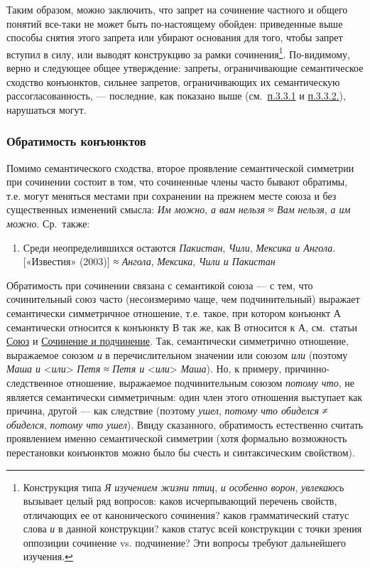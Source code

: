 Таким образом, можно заключить, что запрет на сочинение частного и
общего понятий все-таки не может быть по-настоящему обойден: приведенные
выше способы снятия этого запрета или убирают основания для того, чтобы
запрет вступил в силу, или выводят конструкцию за рамки
сочинения\footnote{Конструкция типа \textit{Я изучением жизни птиц},
  \textit{и особенно ворон}, \textit{увлекаюсь} вызывает целый ряд вопросов:
  каков исчерпывающий перечень свойств, отличающих ее от канонического
  сочинения? каков грамматический статус слова \textit{и} в данной
  конструкции? каков статус всей конструкции с точки зрения оппозиции
  сочинение vs. подчинение? Эти вопросы требуют дальнейшего изучения.}.
По-видимому, верно и следующее общее утверждение: запреты,
ограничивающие семантическое сходство конъюнктов, сильнее запретов,
ограничивающих их семантическую рассогласованность, --- последние, как
показано выше (см.~\underline{п.3.3.1} и \underline{п.3.3.2.}),
нарушаться могут.

\subsubsection{Обратимость
  конъюнктов}\label{ux43eux431ux440ux430ux442ux438ux43cux43eux441ux442ux44c-ux43aux43eux43dux44aux44eux43dux43aux442ux43eux432}

Помимо семантического сходства, второе проявление семантической
симметрии при сочинении состоит в том, что сочиненные члены часто бывают
обратимы, т.е. могут меняться местами при сохранении на прежнем месте
союза и без существенных изменений смысла: \textit{Им можно}, \textit{а вам
  нельзя} ≈ \textit{Вам нельзя}, \textit{а им можно}. Ср.~также:

\begin{enumerate}
  \def\labelenumi{(\arabic{enumi})}
  \setcounter{enumi}{23}
  \item
        Среди неопределившихся остаются \textit{Пакистан}, \textit{Чили},
        \textit{Мексика и Ангола}. {[}«Известия» (2003){]} ≈ \textit{Ангола},
        \textit{Мексика}, \textit{Чили и Пакистан}
\end{enumerate}

Обратимость при сочинении связана с семантикой союза --- с тем, что
сочинительный союз часто (несоизмеримо чаще, чем подчинительный)
выражает семантически симметричное отношение, т.е. такое, при котором
конъюнкт А семантически относится к конъюнкту В так же, как В относится
к А, см.~статьи \underline{Союз} и \underline{Сочинение и подчинение}.
Так, семантически симметрично отношение, выражаемое союзом \textit{и} в
перечислительном значении или союзом \textit{или} (поэтому \textit{Маша и}
\textless{}\textit{или}\textgreater{} \textit{Петя} ≈ \textit{Петя и}
\textless{}\textit{или}\textgreater{} \textit{Маша}). Но, к примеру,
причинно-следственное отношение, выражаемое подчинительным союзом
\textit{потому что}, не является семантически симметричным: один член
этого отношения выступает как причина, другой --- как следствие (поэтому
\textit{ушел}, \textit{потому что обиделся} ≠ \textit{обиделся}, \textit{потому
  что ушел}). Ввиду сказанного, обратимость естественно считать
проявлением именно семантической симметрии (хотя формально возможность
перестановки конъюнктов можно было бы счесть и синтаксическим
свойством).

